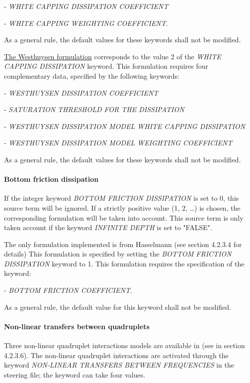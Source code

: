 - \textit{WHITE CAPPING DISSIPATION COEFFICIENT}   

- \textit{WHITE CAPPING WEIGHTING COEFFICIENT}.

  \textit{}

 As a general rule, the default values for these keywords shall not be modified.

 \underline{  The Westhuysen formulation} corresponds to the value 2 of the \textit{WHITE CAPPING DISSIPATION} keyword. This formulation requires four complementary data, specified by the following keywords:  

-  \textit{WESTHUYSEN DISSIPATION COEFFICIENT}

-  \textit{SATURATION THRESHOLD FOR THE DISSIPATION}

-  \textit{WESTHUYSEN DISSIPATION MODEL WHITE CAPPING DISSIPATION}

-  \textit{WESTHUYSEN DISSIPATION MODEL WEIGHTING COEFFICIENT}

  \textit{}

As a general rule, the default values for these keywords shall not be modified.

\paragraph{ Bottom friction dissipation}

 If the integer keyword \textit{BOTTOM FRICTION DISSIPATION} is set to 0, this source term will be ignored. If a strictly positive value (1, 2, \dots ) is chosen, the corresponding formulation will be taken into account. This source term is only taken account if the keyword \textit{INFINITE DEPTH} is set to "FALSE".

 The only formulation implemented is from Hasselmann (see section 4.2.3.4 for details) This formulation is specified by setting the \textit{BOTTOM FRICTION DISSIPATION} keyword to 1. This formulation requires the specification of the keyword:

  - \textit{BOTTOM FRICTION COEFFICIENT}.

 As a general rule, the default value for this keyword shall not be modified.


\paragraph{ Non-linear transfers between quadruplets}

 Three non-linear quadruplet interactions models are available in \tomawac (see in section 4.2.3.6). The non-linear quadruplet interactions are activated through the keyword \textit{NON-LINEAR TRANSFERS BETWEEN FREQUENCIES} in the steering file; the keyword can take four values.

